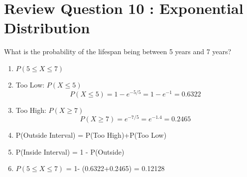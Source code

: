 \section{Review Question 10 :  Exponential Distribution}
What is the probability of the lifespan being between 5 years and 7 years?
    \begin{enumerate}
    \item $P(5 \leq X \leq 7)$
    \item Too Low: $P(X \leq 5)$
    \[P(X \leq 5) = 1- e^{-5/5} = 1-e^{-1} = 0.6322 \]
    \item Too High: $P(X \geq 7)$
    \[P(X \geq 7) = e^{-7/5} = e^{-1.4} = 0.2465 \]
    \item P(Outside Interval) = P(Too High)+P(Too Low)
    \item P(Inside Interval) = 1 - P(Outside)
    \item $P(5 \leq X \leq 7)$ = 1- (0.6322+0.2465) = 0.12128
    \end{enumerate}
